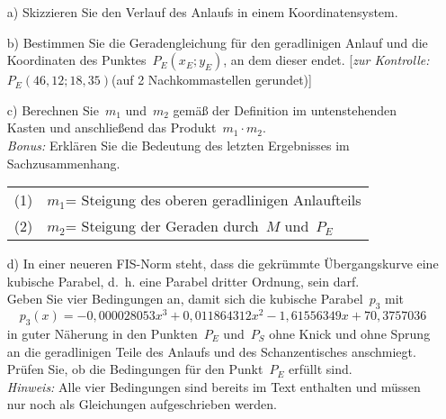 	\begin{itemize}
		\item[a)]Skizzieren Sie den Verlauf des Anlaufs in einem Koordinatensystem.
		\item[b)]Bestimmen Sie die Geradengleichung für den geradlinigen Anlauf und die Koordinaten des Punktes~$P_E(x_E;y_E)$, an dem dieser endet. [\emph{zur Kontrolle:}~$P_E(46,12;18,35)$(auf 2 Nachkommastellen gerundet)]
		\item[c)]Berechnen Sie~$m_1$ und~$m_2$ gemäß der Definition im untenstehenden Kasten und anschließend das Produkt~$m_1 \cdot m_2$.\\
		\emph{Bonus:} Erklären Sie die Bedeutung des letzten Ergebnisses im Sachzusammenhang.\\[-0,3cm]
		\renewcommand{\arraystretch}{1.2}
		\begin{center}
			\begin{tabular}{|cl|} \hline
				(1) &	$m_1$= Steigung des oberen geradlinigen Anlaufteils\\
				(2)	&	$m_2$= Steigung der Geraden durch~$M$ und~$P_E$\\ \hline
			\end{tabular}
		\end{center}
		\renewcommand{\arraystretch}{1}
		\item[d)]In einer neueren FIS-Norm steht, dass die gekrümmte Übergangskurve eine kubische Parabel, d.~h. eine Parabel dritter Ordnung, sein darf.\\
		Geben Sie vier Bedingungen an, damit sich die kubische Parabel~$p_3$ mit
		\begin{equation*}
			p_3(x)=-0,000028053x^3+0,011864312x^2-1,61556349x+70,3757036
		\end{equation*}
		in guter Näherung in den Punkten~$P_E$ und~$P_S$ ohne Knick und ohne Sprung an die geradlinigen Teile des Anlaufs und des Schanzentisches anschmiegt. Prüfen Sie, ob die Bedingungen für den Punkt~$P_E$ erfüllt sind.\\[0,3cm]
		\emph{Hinweis:} Alle vier Bedingungen sind bereits im Text enthalten und müssen nur noch als Gleichungen aufgeschrieben werden.
	\end{itemize}
